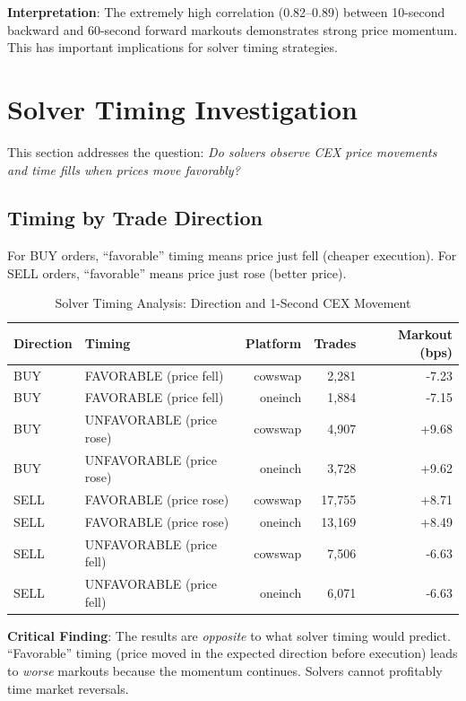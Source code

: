 \documentclass[11pt,a4paper]{article}
\begin{document}
\textbf{Interpretation}: The extremely high correlation (0.82--0.89) between 10-second backward and 60-second forward markouts demonstrates strong price momentum. This has important implications for solver timing strategies.

\section{Solver Timing Investigation}

This section addresses the question: \textit{Do solvers observe CEX price movements and time fills when prices move favorably?}

\subsection{Timing by Trade Direction}

For BUY orders, ``favorable'' timing means price just fell (cheaper execution). For SELL orders, ``favorable'' means price just rose (better price).

\begin{table}[H]
\centering
\caption{Solver Timing Analysis: Direction and 1-Second CEX Movement}
\begin{tabular}{llrrr}
\toprule
\textbf{Direction} & \textbf{Timing} & \textbf{Platform} & \textbf{Trades} & \textbf{Markout (bps)} \\
\midrule
BUY & FAVORABLE (price fell) & cowswap & 2,281 & -7.23 \\
BUY & FAVORABLE (price fell) & oneinch & 1,884 & -7.15 \\
BUY & UNFAVORABLE (price rose) & cowswap & 4,907 & +9.68 \\
BUY & UNFAVORABLE (price rose) & oneinch & 3,728 & +9.62 \\
SELL & FAVORABLE (price rose) & cowswap & 17,755 & +8.71 \\
SELL & FAVORABLE (price rose) & oneinch & 13,169 & +8.49 \\
SELL & UNFAVORABLE (price fell) & cowswap & 7,506 & -6.63 \\
SELL & UNFAVORABLE (price fell) & oneinch & 6,071 & -6.63 \\
\bottomrule
\end{tabular}
\end{table}

\textbf{Critical Finding}: The results are \textit{opposite} to what solver timing would predict. ``Favorable'' timing (price moved in the expected direction before execution) leads to \textit{worse} markouts because the momentum continues. Solvers cannot profitably time market reversals.
\end{document}
